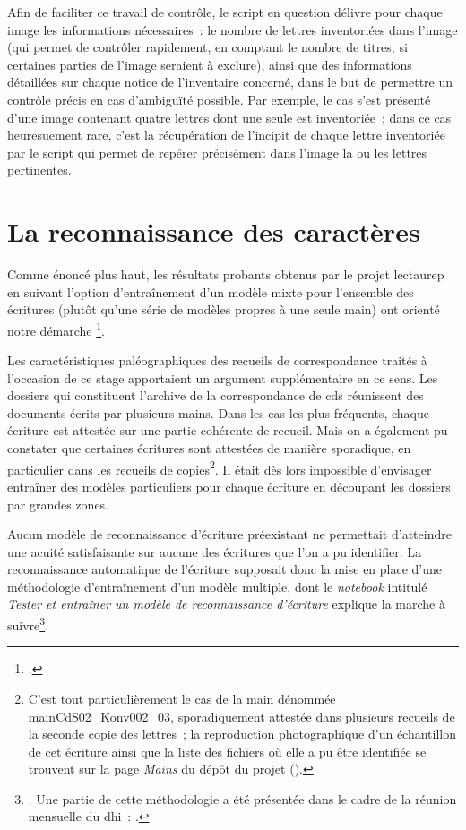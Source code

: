 \documentclass[a4paper,12pt,twoside]{book}
\begin{document}
	    		
	    		Afin de faciliter ce travail de contrôle, le script en question délivre pour chaque image les informations nécessaires~: le nombre de lettres inventoriées dans l'image (qui permet de contrôler rapidement, en comptant le nombre de titres, si certaines parties de l'image seraient à exclure), ainsi que des informations détaillées sur chaque notice de l'inventaire concerné, dans le but de permettre un contrôle précis en cas d'ambiguïté possible. Par exemple, le cas s'est présenté d'une image contenant quatre lettres dont une seule est inventoriée~; dans ce cas heuresuement rare, c'est la récupération de l'incipit de chaque lettre inventoriée par le script qui permet de repérer précisément dans l'image la ou les lettres pertinentes.
				
		\section{La reconnaissance des caractères}
			Comme énoncé plus haut, les résultats probants obtenus par le projet \gls{lectaurep} en suivant l'option d'entraînement d'un modèle mixte pour l'ensemble des écritures (plutôt qu'une série de modèles propres à une seule main) ont orienté notre démarche \footcite{chagueCreationModelesTranscriptiona}.
			
			Les caractéristiques paléographiques des recueils de correspondance traités à l'occasion de ce stage apportaient un argument supplémentaire en ce sens. Les dossiers qui constituent l'archive de la correspondance de \gls{cds} réunissent des documents écrits par plusieurs mains. Dans les cas les plus fréquents, chaque écriture est attestée sur une partie cohérente de recueil. Mais on a également pu constater que certaines écritures sont attestées de manière sporadique, en particulier dans les recueils de copies\footnote{C'est tout particulièrement le cas de la main dénommée mainCdS02\_Konv002\_03, sporadiquement attestée dans plusieurs recueils de la seconde copie des lettres~; la reproduction photographique d'un échantillon de cet écriture ainsi que la liste des fichiers où elle a pu être identifiée se trouvent sur la page \textit{Mains} du dépôt du projet (\cite{biayMains2022}).}. Il était dès lors impossible d'envisager entraîner des modèles particuliers pour chaque écriture en découpant les dossiers par grandes zones.
			
			Aucun modèle de reconnaissance d'écriture préexistant ne permettait d'atteindre une acuité satisfaisante sur aucune des écritures que l'on a pu identifier. La reconnaissance automatique de l'écriture supposait donc la mise en place d'une méthodologie d'entraînement d'un modèle multiple, dont le \textit{notebook} intitulé \textit{Tester et entraîner un modèle de reconnaissance d'écriture} explique la marche à suivre\footnote{\cite{biayTesterEntrainerModele2022}. Une partie de cette méthodologie a été présentée dans le cadre de la réunion mensuelle du \gls{dhi}~: \cite{biayIntelligenceArtificelleIHA2022}.}.
			
\end{document}
